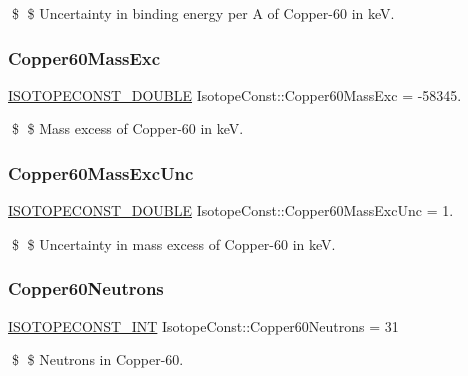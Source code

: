 \$ \$ Uncertainty in binding energy per A of Copper-\/60 in keV. \mbox{\label{group___isotope_const-_copper-_cu60_ga50ad1b7e1fafcb71d4ce623929ac6334}} 
\subsubsection{\texorpdfstring{Copper60\+Mass\+Exc}{Copper60MassExc}}
{\footnotesize\ttfamily \mbox{\hyperlink{group___isotope_const-_macros_ga8f45a7272ce02c0b4c65c44636ed719a}{I\+S\+O\+T\+O\+P\+E\+C\+O\+N\+S\+T\+\_\+\+D\+O\+U\+B\+LE}} Isotope\+Const\+::\+Copper60\+Mass\+Exc = -\/58345.}

\$ \$ Mass excess of Copper-\/60 in keV. \mbox{\label{group___isotope_const-_copper-_cu60_ga055658339e248611335e0f5e39673414}} 
\subsubsection{\texorpdfstring{Copper60\+Mass\+Exc\+Unc}{Copper60MassExcUnc}}
{\footnotesize\ttfamily \mbox{\hyperlink{group___isotope_const-_macros_ga8f45a7272ce02c0b4c65c44636ed719a}{I\+S\+O\+T\+O\+P\+E\+C\+O\+N\+S\+T\+\_\+\+D\+O\+U\+B\+LE}} Isotope\+Const\+::\+Copper60\+Mass\+Exc\+Unc = 1.}

\$ \$ Uncertainty in mass excess of Copper-\/60 in keV. \mbox{\label{group___isotope_const-_copper-_cu60_ga87ccc7e776854b82cb9d3b2d7dbd3684}} 
\subsubsection{\texorpdfstring{Copper60\+Neutrons}{Copper60Neutrons}}
{\footnotesize\ttfamily \mbox{\hyperlink{group___isotope_const-_macros_ga5f18360b3e99483a35c32d789e62621c}{I\+S\+O\+T\+O\+P\+E\+C\+O\+N\+S\+T\+\_\+\+I\+NT}} Isotope\+Const\+::\+Copper60\+Neutrons = 31}

\$ \$ Neutrons in Copper-\/60. \mbox{\label{group___isotope_const-_copper-_cu60_ga18f6753a6515964b8d42d9d5a4ef36ed}} 
